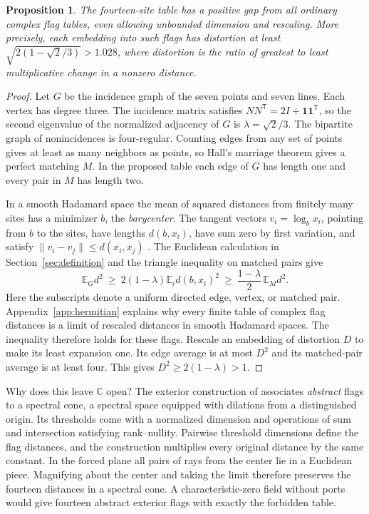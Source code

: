 \documentclass[11pt]{article}
\newtheorem{proposition}[theorem]{Proposition}
\theoremstyle{definition}
\newcommand{\E}{\mathbb E}
\newcommand{\one}{\mathbf 1}
\begin{document}
\begin{proposition}\label{prop:flags}
The fourteen-site table has a positive gap from all ordinary complex flag
tables, even allowing unbounded dimension and rescaling. More precisely,
each embedding into such flags has distortion at least
\(\sqrt{2(1-\sqrt2/3)}>1.028\), where distortion is the ratio of greatest
to least multiplicative change in a nonzero distance.
\end{proposition}
\begin{proof}
Let \(G\) be the incidence graph of the seven points and seven lines. Each
vertex has degree three. The incidence matrix satisfies
\(NN^{\mathsf T}=2I+\one\one^{\mathsf T}\), so the second eigenvalue of
the normalized adjacency of \(G\) is \(\lambda=\sqrt2/3\). The bipartite
graph of nonincidences is four-regular. Counting edges from any set of
points gives at least as many neighbors as points, so Hall's marriage
theorem gives a perfect matching \(M\). In the proposed table
each edge of \(G\) has length one and every pair in \(M\) has length two.

In a smooth Hadamard space the mean of squared
distances from finitely many sites has a minimizer \(b\), the
\emph{barycenter}. The tangent vectors \(v_i=\log_b x_i\), pointing from
\(b\) to the sites, have lengths \(d(b,x_i)\), have sum zero by first
variation, and satisfy \(\|v_i-v_j\|\le d(x_i,x_j)\) \cite{izeki}.
The Euclidean calculation in Section~\ref{sec:definition} and the triangle
inequality on matched pairs give
\[
 \E_{G}d^2\ \ge\ 2(1-\lambda)\E_i d(b,x_i)^2
       \ \ge\ \frac{1-\lambda}{2}\,\E_M d^2 .
\]
Here the subscripts denote a uniform directed edge, vertex, or matched
pair. Appendix~\ref{app:hermitian} explains why every finite table of
complex flag distances is a limit of rescaled distances in smooth
Hadamard spaces. The inequality therefore holds for these flags. Rescale
an embedding of distortion \(D\) to make its least expansion one. Its
edge average is at most \(D^2\) and its matched-pair average is at least
four. This gives \(D^2\ge2(1-\lambda)>1\).
\end{proof}

Why does this leave \(\mathbb C\) open? The exterior construction of
\cite{circuits} associates \emph{abstract} flags to a spectral cone, a
spectral space equipped with dilations from a distinguished origin.
Its thresholds come with a normalized dimension and operations of sum
and intersection satisfying rank--nullity. Pairwise threshold dimensions
define the flag distances, and the construction multiplies every original
distance by the same constant. In the forced plane all pairs of rays from
the center lie in a Euclidean piece. Magnifying about the center and
taking the limit therefore preserves the fourteen distances in a spectral
cone. A characteristic-zero field without ports would give fourteen
abstract exterior flags with exactly the forbidden table.
\end{document}
